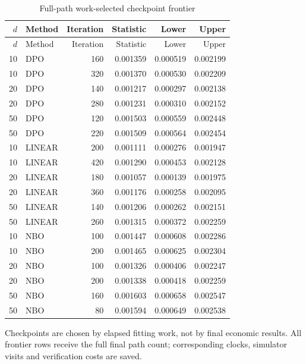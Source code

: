 \begingroup\small\setlength{\tabcolsep}{4pt}
\begin{longtable}{rlrrrr}
\caption{Full-path work-selected checkpoint frontier}\label{tab:r12frontier}\\
\toprule
$d$ & Method & Iteration & Statistic & Lower & Upper\\\midrule
\endfirsthead
\toprule
$d$ & Method & Iteration & Statistic & Lower & Upper\\\midrule
\endhead
10 & DPO & 160 & 0.001359 & 0.000519 & 0.002199\\
10 & DPO & 320 & 0.001370 & 0.000530 & 0.002209\\
20 & DPO & 140 & 0.001217 & 0.000297 & 0.002138\\
20 & DPO & 280 & 0.001231 & 0.000310 & 0.002152\\
50 & DPO & 120 & 0.001503 & 0.000559 & 0.002448\\
50 & DPO & 220 & 0.001509 & 0.000564 & 0.002454\\
10 & LINEAR & 200 & 0.001111 & 0.000276 & 0.001947\\
10 & LINEAR & 420 & 0.001290 & 0.000453 & 0.002128\\
20 & LINEAR & 180 & 0.001057 & 0.000139 & 0.001975\\
20 & LINEAR & 360 & 0.001176 & 0.000258 & 0.002095\\
50 & LINEAR & 140 & 0.001206 & 0.000262 & 0.002151\\
50 & LINEAR & 260 & 0.001315 & 0.000372 & 0.002259\\
10 & NBO & 100 & 0.001447 & 0.000608 & 0.002286\\
10 & NBO & 200 & 0.001465 & 0.000625 & 0.002304\\
20 & NBO & 100 & 0.001326 & 0.000406 & 0.002247\\
20 & NBO & 200 & 0.001338 & 0.000418 & 0.002259\\
50 & NBO & 160 & 0.001603 & 0.000658 & 0.002547\\
50 & NBO & 80 & 0.001594 & 0.000649 & 0.002538\\
\bottomrule\end{longtable}
\noindent Checkpoints are chosen by elapsed fitting work, not by final economic results. All frontier rows receive the full final path count; corresponding clocks, simulator visits and verification costs are saved.
\endgroup
